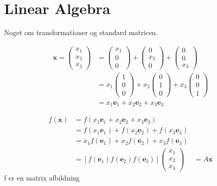 \chapter {Linear Algebra} 
Noget om transformationer og standard matricen.

\begin{align*}
    \textbf{x}=
    \begin{pmatrix}x_1 
        \\x_2 \\ x_3 
    \end{pmatrix} &= 
    \begin{pmatrix}
        x_1 \\ 0 \\ 0  
    \end{pmatrix} + 
    \begin{pmatrix}
        0 \\ x_2 \\ 0  
    \end{pmatrix} + 
    \begin{pmatrix}
        0 \\ 0 \\ x_3  
    \end{pmatrix}\\ &= x_1  
   \begin{pmatrix}
        1 \\ 0\\ 0  
   \end{pmatrix}+ x_2 
   \begin{pmatrix}
        0 \\ 1 \\ 0  
   \end{pmatrix} + x_3 
   \begin{pmatrix}
        0 \\ 0 \\ 1  
   \end{pmatrix} \\ &= x_1 \textbf{e}_1 + x_2\textbf{e}_2+x_3 \textbf{e}_3
\end{align*}

\begin{align*}
f(\textbf{x})&=f(x_1 \textbf{e}_1 + x_2\textbf{e}_2+x_3 \textbf{e}_3)\\ 
&= f(x_1 \textbf{e}_1) + f(x_2 \textbf{e}_2) + f(x_3 \textbf{e}_3) \\
&=x_1 f(\textbf{e}_1) + x_2 f(\textbf{e}_2) + x_3 f(\textbf{e}_3)
\\ &= [f(\textbf{e}_1) f(\textbf{e}_2 ) f(\textbf{e}_3)] 
\begin{pmatrix}
    x_1 \\x_2 \\ x_3 
\end{pmatrix} &= A \textbf{x}
\end{align*}
f er en matrix afbildning

